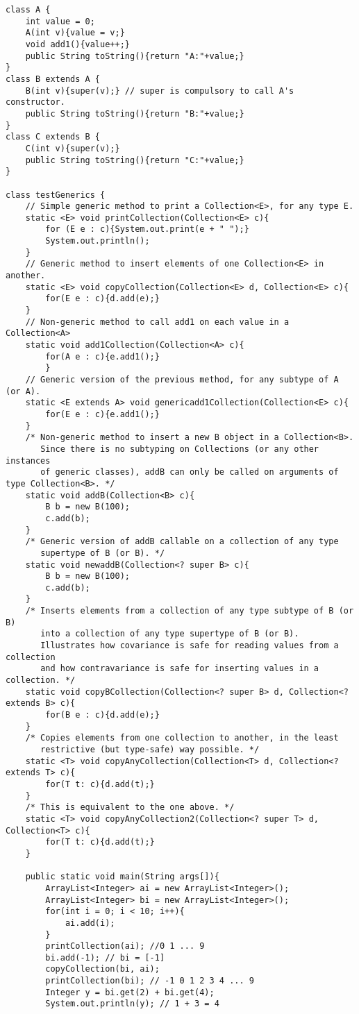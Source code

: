\documentclass[10pt]{article}
\begin{document}
\begin{verbatim}
class A {
    int value = 0;
    A(int v){value = v;}
    void add1(){value++;}
    public String toString(){return "A:"+value;}
}
class B extends A {
    B(int v){super(v);} // super is compulsory to call A's constructor.
    public String toString(){return "B:"+value;}
}
class C extends B {
    C(int v){super(v);}
    public String toString(){return "C:"+value;}
}

class testGenerics {
    // Simple generic method to print a Collection<E>, for any type E.
    static <E> void printCollection(Collection<E> c){
        for (E e : c){System.out.print(e + " ");}
        System.out.println();
    }
    // Generic method to insert elements of one Collection<E> in another.
    static <E> void copyCollection(Collection<E> d, Collection<E> c){
        for(E e : c){d.add(e);}
    }
    // Non-generic method to call add1 on each value in a Collection<A>
    static void add1Collection(Collection<A> c){
        for(A e : c){e.add1();}
        }
    // Generic version of the previous method, for any subtype of A (or A).
    static <E extends A> void genericadd1Collection(Collection<E> c){
        for(E e : c){e.add1();}
    }
    /* Non-generic method to insert a new B object in a Collection<B>.
       Since there is no subtyping on Collections (or any other instances 
       of generic classes), addB can only be called on arguments of type Collection<B>. */
    static void addB(Collection<B> c){
        B b = new B(100);
        c.add(b);
    }
    /* Generic version of addB callable on a collection of any type 
       supertype of B (or B). */
    static void newaddB(Collection<? super B> c){
        B b = new B(100);
        c.add(b);
    }
    /* Inserts elements from a collection of any type subtype of B (or B) 
       into a collection of any type supertype of B (or B).
       Illustrates how covariance is safe for reading values from a collection 
       and how contravariance is safe for inserting values in a collection. */
    static void copyBCollection(Collection<? super B> d, Collection<? extends B> c){
        for(B e : c){d.add(e);}
    }
    /* Copies elements from one collection to another, in the least 
       restrictive (but type-safe) way possible. */
    static <T> void copyAnyCollection(Collection<T> d, Collection<? extends T> c){
        for(T t: c){d.add(t);}
    }
    /* This is equivalent to the one above. */
    static <T> void copyAnyCollection2(Collection<? super T> d, Collection<T> c){
        for(T t: c){d.add(t);}
    }

    public static void main(String args[]){
        ArrayList<Integer> ai = new ArrayList<Integer>();
        ArrayList<Integer> bi = new ArrayList<Integer>();
        for(int i = 0; i < 10; i++){
            ai.add(i);
        }
        printCollection(ai); //0 1 ... 9
        bi.add(-1); // bi = [-1]
        copyCollection(bi, ai); 
        printCollection(bi); // -1 0 1 2 3 4 ... 9
        Integer y = bi.get(2) + bi.get(4);
        System.out.println(y); // 1 + 3 = 4


\end{verbatim}
\end{document}
